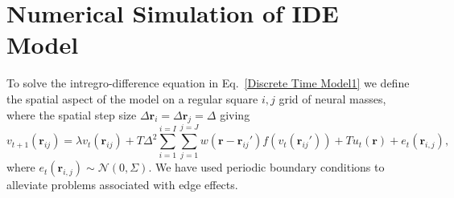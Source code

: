 \documentclass[onecolumn,draftcls]{IEEEtran}
\begin{document}
\section{Numerical Simulation of IDE Model}\label{Space Discretization}
To solve the intregro-difference equation in Eq.~\ref{Discrete Time Model1} we define the spatial aspect of the model on a regular square $i,j$ grid of neural masses, where the spatial step size $\Delta \mathbf{r}_i = \Delta \mathbf{r}_j = \Delta $ giving
\begin{equation}\label{discrete space}
	v_{t+1}\left(\mathbf{r}_{ij}\right) = \lambda v_t\left(\mathbf{r}_{ij}\right) + T \Delta^2 \sum_{i=1}^{i=I}{ \sum_{j=1}^{j=J}{ w\left( \mathbf{r}-\mathbf{r}_{ij}' \right)f\left( v_t\left( \mathbf{r}_{ij}'\right) \right)} } + T u_t\left(\mathbf{r}\right) + e_t(\mathbf{r}_{i,j}),
\end{equation}
where $e_t(\mathbf{r}_{i,j}) \sim \mathcal{N}\left(0,\Sigma\right)$.
We have used periodic boundary conditions to alleviate problems associated with edge effects.
\end{document}
